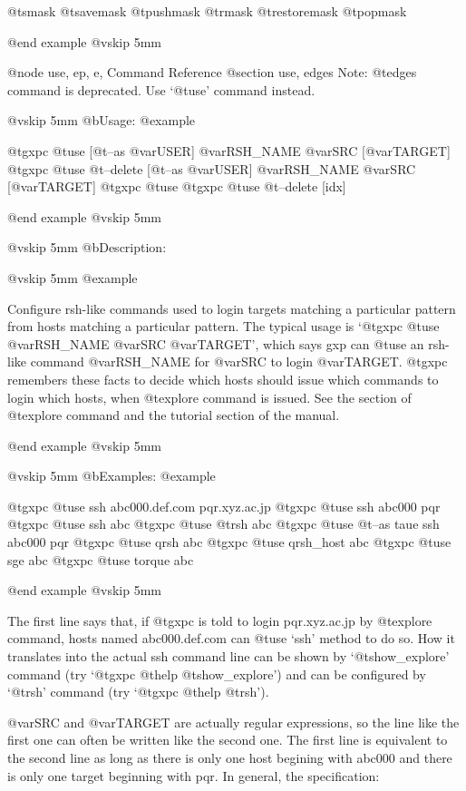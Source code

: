   @t{smask} @t{savemask} @t{pushmask} @t{rmask} @t{restoremask} @t{popmask}

@end example
@vskip 5mm

@node use, ep, e, Command Reference
@section use, edges
Note: @t{edges} command is deprecated.
Use `@t{use}' command instead.

@vskip 5mm
@b{Usage:}
@example

  @t{gxpc} @t{use}          [@t{--as} @var{USER}] @var{RSH_NAME} @var{SRC} [@var{TARGET}]
  @t{gxpc} @t{use} @t{--delete} [@t{--as} @var{USER}] @var{RSH_NAME} @var{SRC} [@var{TARGET}]
  @t{gxpc} @t{use}
  @t{gxpc} @t{use} @t{--delete} [idx]

@end example
@vskip 5mm

@vskip 5mm
@b{Description:}



@vskip 5mm
@example

  Configure rsh-like commands used to login targets matching a
particular pattern from hosts matching a particular pattern. The
typical usage is `@t{gxpc} @t{use} @var{RSH_NAME} @var{SRC} @var{TARGET}', which says gxp can
@t{use} an rsh-like command @var{RSH_NAME} for @var{SRC} to login @var{TARGET}. @t{gxpc}
remembers these facts to decide which hosts should issue which
commands to login which hosts, when @t{explore} command is issued. See the
section of @t{explore} command and the tutorial section of the manual.

@end example
@vskip 5mm

@vskip 5mm
@b{Examples:}
@example

  @t{gxpc} @t{use}           ssh abc000.def.com pqr.xyz.ac.jp
  @t{gxpc} @t{use}           ssh abc000 pqr
  @t{gxpc} @t{use}           ssh abc
  @t{gxpc} @t{use}           @t{rsh} abc
  @t{gxpc} @t{use} @t{--as} taue ssh abc000 pqr
  @t{gxpc} @t{use} qrsh      abc
  @t{gxpc} @t{use} qrsh_host abc
  @t{gxpc} @t{use} sge       abc
  @t{gxpc} @t{use} torque    abc

@end example
@vskip 5mm

The first line says that, if @t{gxpc} is told to login pqr.xyz.ac.jp by
@t{explore} command, hosts named abc000.def.com can @t{use} `ssh' method to do
so.  How it translates into the actual ssh command line can be shown
by `@t{show_explore}' command (try `@t{gxpc} @t{help} @t{show_explore}') and can be
configured by `@t{rsh}' command (try `@t{gxpc} @t{help} @t{rsh}').

@var{SRC} and @var{TARGET} are actually regular expressions, so the line like the
first one can often be written like the second one.  The first line
is equivalent to the second line as long as there is only one host
begining with abc000 and there is only one target beginning with pqr.
In general, the specification:

